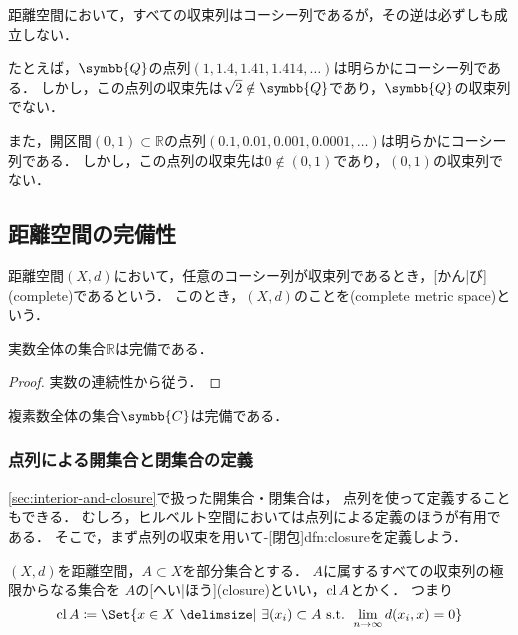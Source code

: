 \documentclass[../sotsu.tex]{subfiles}
\begin{document}
距離空間において，すべての収束列はコーシー列であるが，その逆は必ずしも成立しない．

たとえば，$\symbb{Q}$の点列$(1, 1.4, 1.41, 1.414, \dotsc)$は明らかにコーシー列である．
しかし，この点列の収束先は$\sqrt{2} \notin \symbb{Q}$であり，$\symbb{Q}$の収束列でない．

また，開区間$(0, 1) \subset ℝ$の点列$(0.1, 0.01, 0.001, 0.0001, \dotsc)$は明らかにコーシー列である．
しかし，この点列の収束先は$0 \notin (0, 1)$であり，$(0, 1)$の収束列でない．


\subsection{距離空間の完備性}
\label{sec:complete-metric-space}

\begin{definition}
    \label{dfn:complete-metric-space}
    距離空間$(X, d)$において，任意のコーシー列が収束列であるとき，[かん|び](complete)であるという．
    このとき，$(X, d)$のことを(complete metric space)という．
\end{definition}


\begin{proposition}[実数の完備性]
    実数全体の集合$ℝ$は完備である．
\end{proposition}

\begin{proof}
    実数の連続性から従う．
\end{proof}


\begin{corollary}
    複素数全体の集合$\symbb{C}$は完備である．
\end{corollary}



\subsubsection*{点列による開集合と閉集合の定義}

\cref{sec:interior-and-closure}で扱った開集合・閉集合は，
点列を使って定義することもできる．
むしろ，ヒルベルト空間においては点列による定義のほうが有用である．
そこで，まず点列の収束を用いて-[閉包]{dfn:closure}を定義しよう．

\begin{definition}[点列による閉包の定義]
    \label{dfn:closure-by-sequence}
    $(X, d)$を距離空間，$A \subset X$を部分集合とする．
    $A$に属するすべての収束列の極限からなる集合を
    $A$の[へい|ほう](closure)といい，$\operatorname{cl}{A}$とかく．
    つまり
    \begin{equation}
        \closureop{A} \coloneq \Set{ x \in X  \given  \exists (x_i) \subset A \text{ s.t. } \lim_{n \to \infty} d(x_i, x) = 0 }
    \end{equation}
\end{definition}
\end{document}
